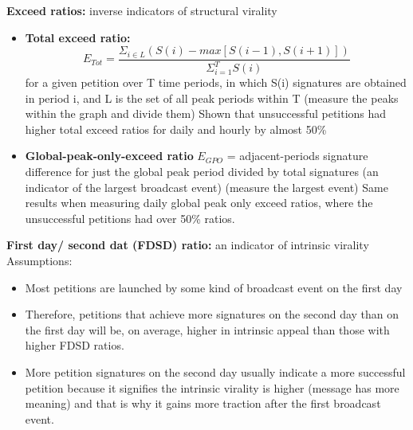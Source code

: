 \documentclass{article}
\begin{document}
\noindent \textbf{Exceed ratios:} inverse indicators of structural virality 
\begin{itemize}
    \item \textbf{Total exceed ratio:} 
    \begin{equation}
        E_{Tot} = \frac{\Sigma_{i \in L}(S(i) - max[S(i-1), S(i+1)])}{\Sigma_{i = 1}^T S(i)}
    \end{equation}
        \subitem for a given petition over T time periods, in which S(i) signatures are obtained in period i, and L is the set of all peak periods within T (measure the peaks within the graph and divide them) 
        \subitem Shown that unsuccessful petitions had higher total exceed ratios for daily and hourly by almost 50\%
    \item \textbf{Global-peak-only-exceed ratio} $E_{GPO}$ = adjacent-periods signature difference for just the global peak period divided by total signatures (an indicator of the largest broadcast event) (measure the largest event) 
        \subitem Same results when measuring daily global peak only exceed ratios, where the unsuccessful petitions had over 50\% ratios. 
\end{itemize}

\noindent \textbf{First day/ second dat (FDSD) ratio:} an indicator of intrinsic virality \\
Assumptions:
\begin{itemize}
    \item Most petitions are launched by some kind of broadcast event on the first day 
    \item Therefore, petitions that achieve more signatures on the second day than on the first day will be, on average, higher in intrinsic appeal than those with higher FDSD ratios. 
    \item More petition signatures on the second day usually indicate a more successful petition because it signifies the intrinsic virality is higher (message has more meaning) and that is why it gains more traction after the first broadcast event. 
\end{itemize}
\end{document}
